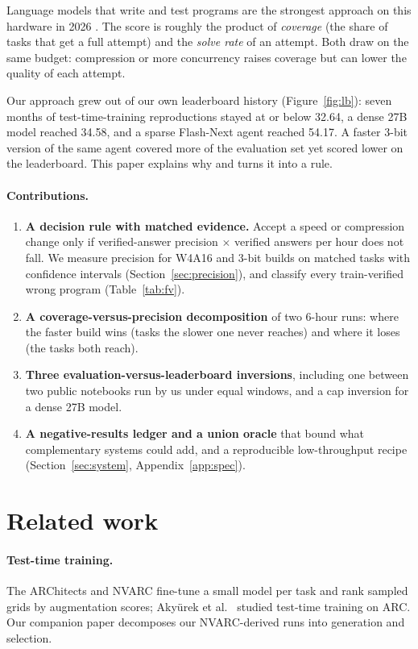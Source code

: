 \documentclass[11pt]{article}
\begin{document}
Language models that write and test programs are the strongest approach on this hardware in 2026 \cite{greenblatt2024,pivotools2026,notnitsuj2026}. The score is roughly the product of \emph{coverage} (the share of tasks that get a full attempt) and the \emph{solve rate} of an attempt. Both draw on the same budget: compression or more concurrency raises coverage but can lower the quality of each attempt.

Our approach grew out of our own leaderboard history (Figure~\ref{fig:lb}): seven months of test-time-training reproductions stayed at or below 32.64, a dense 27B model reached 34.58, and a sparse Flash-Next agent reached 54.17. A faster 3-bit version of the same agent covered more of the evaluation set yet scored lower on the leaderboard. This paper explains why and turns it into a rule.

\paragraph{Contributions.}
\begin{enumerate}
\item \textbf{A decision rule with matched evidence.} Accept a speed or compression change only if verified-answer precision $\times$ verified answers per hour does not fall. We measure precision for W4A16 and 3-bit builds on matched tasks with confidence intervals (Section~\ref{sec:precision}), and classify every train-verified wrong program (Table~\ref{tab:fv}).
\item \textbf{A coverage-versus-precision decomposition} of two 6-hour runs: where the faster build wins (tasks the slower one never reaches) and where it loses (the tasks both reach).
\item \textbf{Three evaluation-versus-leaderboard inversions}, including one between two public notebooks run by us under equal windows, and a cap inversion for a dense 27B model.
\item \textbf{A negative-results ledger and a union oracle} that bound what complementary systems could add, and a reproducible low-throughput recipe (Section~\ref{sec:system}, Appendix~\ref{app:spec}).
\end{enumerate}

\section{Related work}
\paragraph{Test-time training.} The ARChitects \cite{architects2024,architectspoe} and NVARC \cite{nvarc2025} fine-tune a small model per task and rank sampled grids by augmentation scores; Aky\"urek et al.\ \cite{akyurek2024} studied test-time training on ARC. Our companion paper \cite{paper1} decomposes our NVARC-derived runs into generation and selection.
\end{document}
